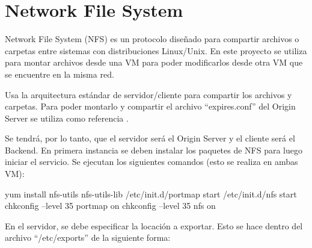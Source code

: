 \documentclass[12pt,a4paper,oneside]{book}
\begin{document}
\vspace{0.5cm}



\section{Network File System}
\label{seccA.2}

Network File System (NFS) es un protocolo diseñado para compartir archivos o carpetas entre sistemas con distribuciones Linux/Unix. En este proyecto se utiliza para montar archivos desde una VM para poder modificarlos desde otra VM que se encuentre en la misma red.

\vspace{0.5cm}

Usa la arquitectura estándar de servidor/cliente para compartir los archivos y carpetas. Para poder montarlo y compartir el archivo ``expires.conf'' del Origin Server se utiliza como referencia \cite{tecmint_NFS}.

\vspace{0.5cm}

Se tendrá, por lo tanto, que el servidor será el Origin Server y el cliente será el Backend.
En primera instancia se deben instalar los paquetes de NFS para luego iniciar el servicio. Se ejecutan los siguientes comandos (esto se realiza en ambas VM):

\vspace{0.5cm}

\begin{origin}
yum install nfs-utils nfs-utils-lib
/etc/init.d/portmap start
/etc/init.d/nfs start
chkconfig --level 35 portmap on
chkconfig --level 35 nfs on
\end{origin}

\vspace{0.5cm}

En el servidor, se debe especificar la locación a exportar. Esto se hace dentro del archivo ``/etc/exports'' de la siguiente forma:

\end{document}
